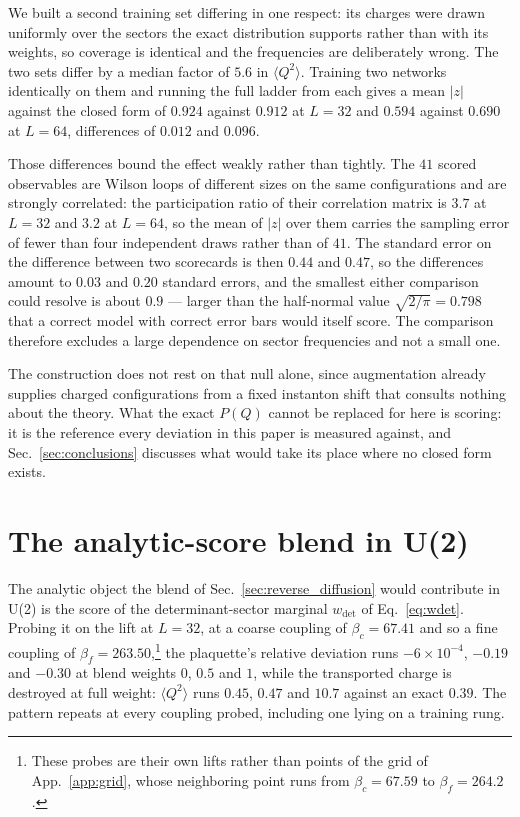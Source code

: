 \documentclass[prd, twocolumn, superscriptaddress, nofootinbib,floatfix]{revtex4-2}
\DeclareRobustCommand{\Eq}[1]{Eq.~\eqref{eq:#1}}
\DeclareRobustCommand{\app}[1]{App.~\ref{app:#1}}
\DeclareRobustCommand{\sect}[1]{Sec.~\ref{sec:#1}}
\begin{document}
We built a second training set differing in one respect: its charges were drawn
uniformly over the sectors the exact distribution supports rather than with its
weights, so coverage is identical and the frequencies are deliberately wrong.
The two sets differ by a median factor of $5.6$ in $\langle Q^2\rangle$.
Training two networks identically on them and running the full ladder from each
gives a mean $|z|$ against the closed form of $0.924$ against $0.912$ at $L=32$
and $0.594$ against $0.690$ at $L=64$, differences of $0.012$ and $0.096$.

Those differences bound the effect weakly rather than tightly. The $41$ scored
observables are Wilson loops of different sizes on the same configurations and
are strongly correlated: the participation ratio of their correlation matrix is
$3.7$ at $L=32$ and $3.2$ at $L=64$, so the mean of $|z|$ over them carries the
sampling error of fewer than four independent draws rather than of $41$. The
standard error on the difference between two
scorecards is then $0.44$ and $0.47$, so the differences amount to $0.03$ and
$0.20$ standard errors, and
the smallest either comparison could resolve is about $0.9$ --- larger than
the half-normal value $\sqrt{2/\pi}=0.798$ that a correct model with correct
error bars would itself score. The comparison therefore excludes a large
dependence on sector frequencies and not a small one.

The construction does not rest on that null alone, since augmentation already
supplies charged configurations from a fixed instanton shift that consults
nothing about the theory. What the exact $P(Q)$ cannot be replaced for here is
scoring: it is the reference every deviation in this paper is measured against,
and \sect{conclusions} discusses what would take its place where no closed form
exists.

\section{The analytic-score blend in U(2)}
\label{app:blend}

The analytic object the blend of \sect{reverse_diffusion} would contribute in
U(2) is the score of the determinant-sector marginal $w_{\det}$ of \Eq{wdet}. Probing it on the lift at $L=32$, at a
coarse coupling of $\beta_c=67.41$ and so a fine coupling of
$\beta_f=263.50$,\footnote{These probes are their own lifts rather than points
of the grid of \app{grid}, whose neighboring point runs from $\beta_c=67.59$ to
$\beta_f=264.2$.} the plaquette's relative deviation runs
$-6\times10^{-4}$, $-0.19$ and $-0.30$ at blend weights $0$, $0.5$ and $1$,
while the transported charge is destroyed at full weight: $\langle Q^2\rangle$
runs $0.45$, $0.47$ and $10.7$ against an exact $0.39$. The pattern repeats at
every coupling probed, including one lying on a training rung.
\end{document}
